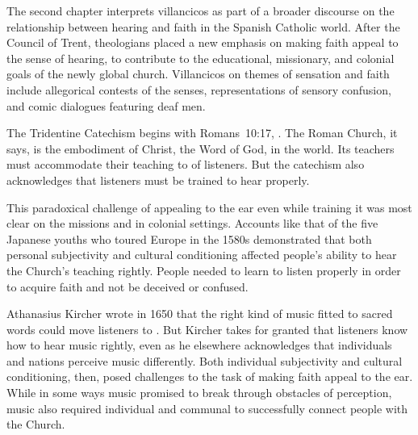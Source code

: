 \documentclass{vcbook-proposal}
\begin{document}
The second chapter interprets villancicos as part of a broader discourse on the 
relationship between hearing and faith in the Spanish Catholic world.
After the Council of Trent, theologians placed a new emphasis on making faith 
appeal to the sense of hearing, to contribute to the educational, missionary, 
and colonial goals of the newly global church.
Villancicos on themes of sensation and faith include allegorical contests of 
the senses, representations of sensory confusion, and comic dialogues featuring 
deaf men.

The Tridentine Catechism begins with Romans~10:17, .%
    \Autocite{Catholic:Catechismus1614}
The Roman Church, it says, is the embodiment of Christ, the Word of God, in the 
world.
Its teachers must accommodate their teaching to  of listeners.
But the catechism also acknowledges that listeners must be trained to hear 
properly.

This paradoxical challenge of appealing to the ear even while training it was 
most clear on the missions and in colonial settings.
Accounts like that of the five Japanese youths who toured Europe in the 1580s 
demonstrated that both personal subjectivity and cultural conditioning affected 
people's ability to hear the Church's teaching rightly.%
  \Autocite{Massarella:JapaneseTravellers}
People needed to learn to listen properly in order to acquire faith and not be 
deceived or confused.

Athanasius Kircher wrote in 1650 that the right kind of music fitted to sacred
words could move listeners to .%
  \Autocite{Kircher:Musurgia}
But Kircher takes for granted that listeners know how to hear music rightly, 
even as he elsewhere acknowledges that individuals and nations perceive music 
differently.
Both individual subjectivity and cultural conditioning, then, posed challenges
to the task of making faith appeal to the ear.
While in some ways music promised to break through obstacles of perception, 
music also required individual and communal  to 
successfully connect people with the Church.
\end{document}
